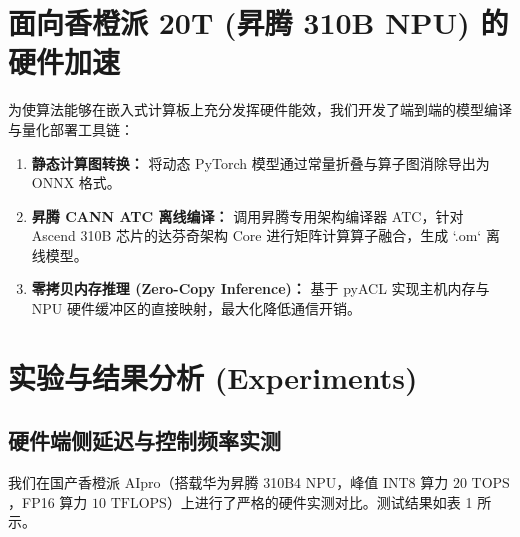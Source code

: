 \documentclass[UTF8,10pt,twocolumn]{ctexart}
\begin{document}
\section{面向香橙派 20T (昇腾 310B NPU) 的硬件加速}
为使算法能够在嵌入式计算板上充分发挥硬件能效，我们开发了端到端的模型编译与量化部署工具链：
\begin{enumerate}
    \item \textbf{静态计算图转换：} 将动态 PyTorch 模型通过常量折叠与算子图消除导出为 ONNX 格式。
    \item \textbf{昇腾 CANN ATC 离线编译：} 调用昇腾专用架构编译器 ATC，针对 Ascend 310B 芯片的达芬奇架构 Core 进行矩阵计算算子融合，生成 `.om` 离线模型。
    \item \textbf{零拷贝内存推理 (Zero-Copy Inference)：} 基于 pyACL 实现主机内存与 NPU 硬件缓冲区的直接映射，最大化降低通信开销。
\end{enumerate}

\section{实验与结果分析 (Experiments)}

\subsection{硬件端侧延迟与控制频率实测}
我们在国产香橙派 AIpro（搭载华为昇腾 310B4 NPU，峰值 INT8 算力 $20\text{ TOPS}$，FP16 算力 $10\text{ TFLOPS}$）上进行了严格的硬件实测对比。测试结果如表 1 所示。

\begin{table}[htbp]
\centering
\small
\caption{香橙派 AIpro (20 TOPS) 上的模型端侧推理延迟与控制频率对比}
\label{tab:edge_benchmark}
\end{table}
\end{document}
